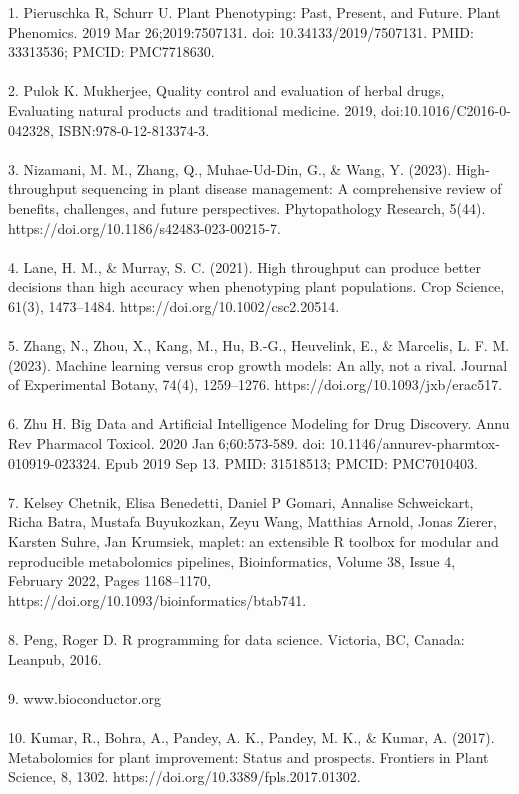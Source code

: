 \documentclass[12pt,a4paper]{report}
\begin{document}
    
1. Pieruschka R, Schurr U. Plant Phenotyping: Past, Present, and Future. Plant Phenomics. 2019 Mar   26;2019:7507131. doi: 10.34133/2019/7507131. PMID: 33313536; PMCID: PMC7718630. \\
\\
2. Pulok K. Mukherjee, Quality control and evaluation of herbal drugs, Evaluating natural products and traditional medicine. 2019, doi:10.1016/C2016-0-042328, ISBN:978-0-12-813374-3. \\
\\
3. Nizamani, M. M., Zhang, Q., Muhae-Ud-Din, G., \& Wang, Y. (2023). High-throughput sequencing in plant disease management: A comprehensive review of benefits, challenges, and future perspectives. Phytopathology Research, 5(44). https://doi.org/10.1186/s42483-023-00215-7. \\
\\
4. Lane, H. M., \& Murray, S. C. (2021). High throughput can produce better decisions than high accuracy when phenotyping plant populations. Crop Science, 61(3), 1473–1484. https://doi.org/10.1002/csc2.20514. \\
\\
5. Zhang, N., Zhou, X., Kang, M., Hu, B.-G., Heuvelink, E., \& Marcelis, L. F. M. (2023). Machine learning versus crop growth models: An ally, not a rival. Journal of Experimental Botany, 74(4), 1259–1276. https://doi.org/10.1093/jxb/erac517. \\
\\
6. Zhu H. Big Data and Artificial Intelligence Modeling for Drug Discovery. Annu Rev Pharmacol Toxicol. 2020 Jan 6;60:573-589. doi: 10.1146/annurev-pharmtox-010919-023324. Epub 2019 Sep 13. PMID: 31518513; PMCID: PMC7010403. \\
\\
7. Kelsey Chetnik, Elisa Benedetti, Daniel P Gomari, Annalise Schweickart, Richa Batra, Mustafa Buyukozkan, Zeyu Wang, Matthias Arnold, Jonas Zierer, Karsten Suhre, Jan Krumsiek,  maplet: an extensible R toolbox for modular and reproducible metabolomics pipelines, Bioinformatics, Volume 38, Issue 4, February 2022, Pages 1168–1170, https://doi.org/10.1093/bioinformatics/btab741. \\
\\
8. Peng, Roger D. R programming for data science. Victoria, BC, Canada: Leanpub, 2016. \\
\\
9. www.bioconductor.org \\
\\
10. Kumar, R., Bohra, A., Pandey, A. K., Pandey, M. K., \& Kumar, A. (2017). Metabolomics for plant improvement: Status and prospects. Frontiers in Plant Science, 8, 1302. https://doi.org/10.3389/fpls.2017.01302. \\
\end{document}
